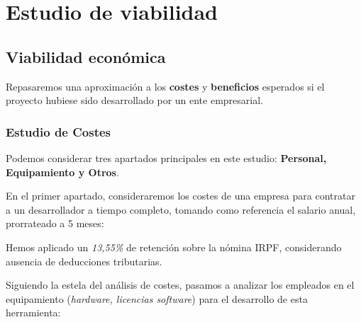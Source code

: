 \newpage

\section{Estudio de viabilidad}

\subsection{Viabilidad económica}

Repasaremos una aproximación a los \textbf{costes} y \textbf{beneficios} esperados si el proyecto hubiese sido desarrollado por un ente empresarial.

\subsubsection{Estudio de Costes}

Podemos considerar tres apartados principales en este estudio:
\textbf{Personal, Equipamiento y Otros}. 

En el primer apartado, consideraremos los costes de una empresa para contratar a un desarrollador a tiempo completo, tomando como referencia el salario anual, prorrateado a 5 meses:


Hemos aplicado un \textit{13,55\%} de retención sobre la nómina IRPF, considerando ausencia de deducciones tributarias.

Siguiendo la estela del análisis de costes, pasamos a analizar los empleados en el equipamiento (\textit{hardware, licencias software}) para el desarrollo de esta herramienta:


